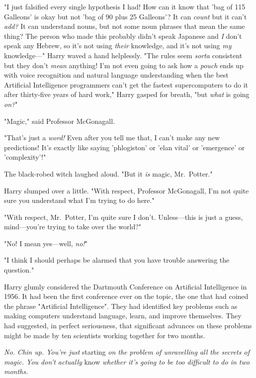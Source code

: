 "I just falsified every single hypothesis I had! How can it know that 'bag of 
115 Galleons' is okay but not 'bag of 90 plus 25 Galleons'? It can \emph{count} 
but it can't \emph{add?} It can understand nouns, but not some noun phrases 
that mean the same thing? The person who made this probably didn't speak 
Japanese and \emph{I} don't speak any Hebrew, so it's not using \emph{their} 
knowledge, and it's not using \emph{my} knowledge---" Harry waved a hand 
helplessly. "The rules seem \emph{sorta} consistent but they don't \emph{mean} 
anything! I'm not even going to ask how a \emph{pouch} ends up with voice 
recognition and natural language understanding when the best Artificial 
Intelligence programmers can't get the fastest supercomputers to do it after 
thirty-five years of hard work," Harry gasped for breath, "but \emph{what} is 
going \emph{on?}"

"Magic," said Professor McGonagall.

"That's just a \emph{word!} Even after you tell me that, I can't make any new 
predictions! It's exactly like saying 'phlogiston' or 'elan vital' or 
'emergence' or 'complexity'!"

The black-robed witch laughed aloud. "But it \emph{is} magic, Mr.~Potter."

Harry slumped over a little. "With respect, Professor McGonagall, I'm not quite 
sure you understand what I'm trying to do here."

"With respect, Mr.~Potter, I'm quite sure I don't. Unless---this is just a 
guess, mind---you're trying to take over the world?"

"No! I mean yes---well, \emph{no!}"

"I think I should perhaps be alarmed that you have trouble answering the 
question."

Harry glumly considered the Dartmouth Conference on Artificial Intelligence in 
1956. It had been the first conference ever on the topic, the one that had 
coined the phrase "Artificial Intelligence". They had identified key problems 
such as making computers understand language, learn, and improve themselves. 
They had suggested, in perfect seriousness, that significant advances on these 
problems might be made by ten scientists working together for two months.

\emph{No. Chin up. You're just} starting\emph{ on the problem of unravelling 
all the secrets of magic. You don't actually} know\emph{ whether it's going to 
be too difficult to do in two months.}

